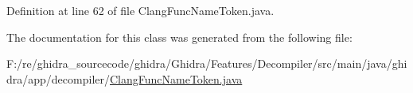 Definition at line 62 of file Clang\+Func\+Name\+Token.\+java.



The documentation for this class was generated from the following file\+:\begin{DoxyCompactItemize}
\item 
F\+:/re/ghidra\+\_\+sourcecode/ghidra/\+Ghidra/\+Features/\+Decompiler/src/main/java/ghidra/app/decompiler/\mbox{\hyperlink{_clang_func_name_token_8java}{Clang\+Func\+Name\+Token.\+java}}\end{DoxyCompactItemize}
